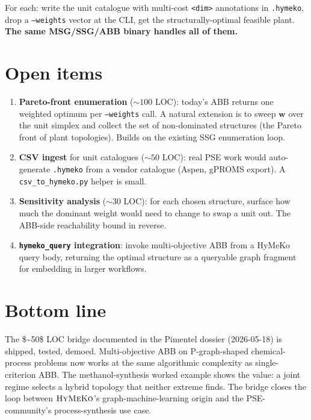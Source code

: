 \documentclass[11pt,a4paper]{article}
\newcommand{\HyMeKo}{\textsc{HyMeKo}}
\newcommand{\code}[1]{\texttt{\small #1}}
\begin{document}
For each: write the unit catalogue with multi-cost \code{<dim>}
annotations in \code{.hymeko}, drop a \code{--weights} vector at
the CLI, get the structurally-optimal feasible plant. \textbf{The
same MSG/SSG/ABB binary handles all of them.}

\section{Open items}

\begin{enumerate}
\item \textbf{Pareto-front enumeration} ($\sim 100$ LOC):
      today's ABB returns one weighted optimum per
      \code{--weights} call. A natural extension is to sweep
      $\boldsymbol{w}$ over the unit simplex and collect the
      set of non-dominated structures (the Pareto front of plant
      topologies). Builds on the existing SSG enumeration loop.
\item \textbf{CSV ingest} for unit catalogues ($\sim 50$ LOC):
      real PSE work would auto-generate \code{.hymeko} from a
      vendor catalogue (Aspen, gPROMS export). A
      \code{csv\_to\_hymeko.py} helper is small.
\item \textbf{Sensitivity analysis} ($\sim 30$ LOC): for each
      chosen structure, surface how much the dominant weight
      would need to change to swap a unit out. The ABB-side
      reachability bound in reverse.
\item \textbf{\code{hymeko\_query} integration}: invoke multi-objective
      ABB from a HyMeKo query body, returning the optimal structure
      as a queryable graph fragment for embedding in larger workflows.
\end{enumerate}

\section*{Bottom line}

The \$\sim 50\$ LOC bridge documented in the Pimentel dossier
(2026-05-18) is shipped, tested, demoed. Multi-objective ABB on
P-graph-shaped chemical-process problems now works at the same
algorithmic complexity as single-criterion ABB. The methanol-synthesis
worked example shows the value: a joint regime selects a hybrid
topology that neither extreme finds. The bridge closes the loop
between $\HyMeKo$'s graph-machine-learning origin and the PSE-community's
process-synthesis use case.
\end{document}
